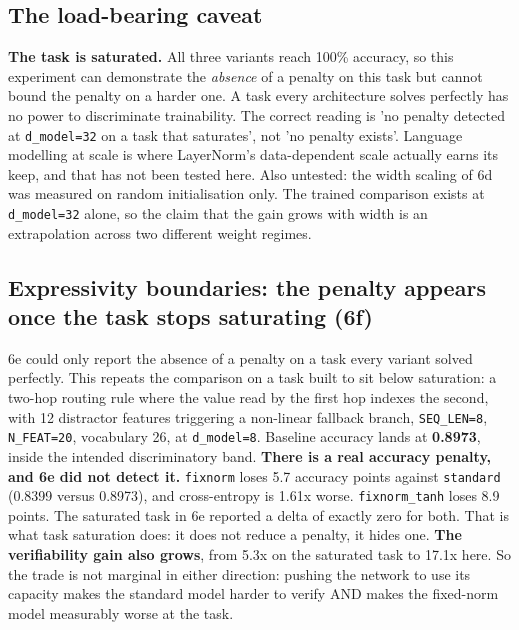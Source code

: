 \documentclass[sn-nature,pdflatex]{sn-jnl}
\begin{document}
\subsection{The load-bearing caveat}
\textbf{The task is saturated.} All three variants reach 100\% accuracy, so this experiment can demonstrate the \emph{absence} of a penalty on this task but cannot bound the penalty on a harder one. A task every architecture solves perfectly has no power to discriminate trainability. The correct reading is 'no penalty detected at \texttt{d\_model=32} on a task that saturates', not 'no penalty exists'. Language modelling at scale is where LayerNorm's data-dependent scale actually earns its keep, and that has not been tested here.
Also untested: the width scaling of 6d was measured on random initialisation only. The trained comparison exists at \texttt{d\_model=32} alone, so the claim that the gain grows with width is an extrapolation across two different weight regimes.
\subsection{Expressivity boundaries: the penalty appears once the task stops saturating (6f)}
6e could only report the absence of a penalty on a task every variant solved perfectly. This repeats the comparison on a task built to sit below saturation: a two-hop routing rule where the value read by the first hop indexes the second, with 12 distractor features triggering a non-linear fallback branch, \texttt{SEQ\_LEN=8}, \texttt{N\_FEAT=20}, vocabulary 26, at \texttt{d\_model=8}. Baseline accuracy lands at \textbf{0.8973}, inside the intended discriminatory band.
\textbf{There is a real accuracy penalty, and 6e did not detect it.} \texttt{fixnorm} loses 5.7 accuracy points against \texttt{standard} (0.8399 versus 0.8973), and cross-entropy is 1.61x worse. \texttt{fixnorm\_tanh} loses 8.9 points. The saturated task in 6e reported a delta of exactly zero for both. That is what task saturation does: it does not reduce a penalty, it hides one.
\textbf{The verifiability gain also grows}, from 5.3x on the saturated task to 17.1x here. So the trade is not marginal in either direction: pushing the network to use its capacity makes the standard model harder to verify AND makes the fixed-norm model measurably worse at the task.
\end{document}
